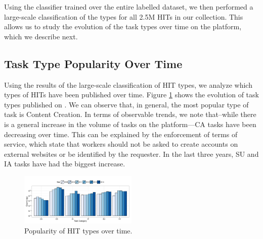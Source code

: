 Using the classifier trained over the entire labelled dataset, we then performed a large-scale classification of the types for all 2.5M HITs in our collection. This allows us to study the evolution of the task types over time on the \amt{} platform, which we describe next.

\subsection{Task Type Popularity Over Time}
Using the results of the large-scale classification of HIT types, we analyze which types of HITs have been published over time.
Figure \ref{fig:cat_trends} shows the evolution of task types published on \amt{}.
% 
We can observe that, in general, the most popular type of task is Content Creation.
% 
In terms of observable trends, we note that--while there is a general increase in the volume of tasks on the platform---CA tasks have been decreasing over time. This can be explained  by the enforcement of \amt{} terms of service, which state that workers should not be asked to create accounts on external websites or be identified by the requester.
% 
In the last three years, SU and IA tasks have had the biggest increase.

\begin{figure}[htbp]
	\centering
		\includegraphics[width=0.5\textwidth]{figures/category_trends}
	\caption{Popularity of HIT types over time.}
	\label{fig:cat_trends}
\end{figure}

